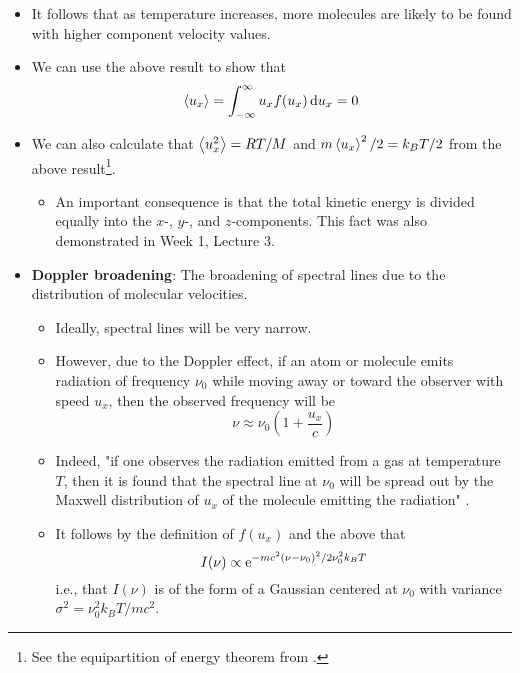 \documentclass[../notes.tex]{subfiles}
\begin{document}
\begin{itemize}
\begin{itemize}
    \end{itemize}
    \item It follows that as temperature increases, more molecules are likely to be found with higher component velocity values.
    \item We can use the above result to show that
    \begin{equation*}
        \prb{u_x} = \int_{-\infty}^\infty u_xf(u_x)\dd{u_x} = 0
    \end{equation*}
    \item We can also calculate that $\prb{u_x^2}=RT/M$ and $m\prb{u_x}^2/2=k_BT/2$ from the above result\footnote{See the equipartition of energy theorem from \textcite{bib:PHYS13300Notes}.}.
    \begin{itemize}
        \item An important consequence is that the total kinetic energy is divided equally into the $x$-, $y$-, and $z$-components. This fact was also demonstrated in Week 1, Lecture 3.
    \end{itemize}
    \item \textbf{Doppler broadening}: The broadening of spectral lines due to the distribution of molecular velocities.
    \begin{itemize}
        \item Ideally, spectral lines will be very narrow.
        \item However, due to the Doppler effect, if an atom or molecule emits radiation of frequency $\nu_0$ while moving away or toward the observer with speed $u_x$, then the observed frequency will be
        \begin{equation*}
            \nu \approx \nu_0\left( 1+\frac{u_x}{c} \right)
        \end{equation*}
        \item Indeed, "if one observes the radiation emitted from a gas at temperature $T$, then it is found that the spectral line at $\nu_0$ will be spread out by the Maxwell distribution of $u_x$ of the molecule emitting the radiation" \parencite[1021]{bib:McQuarrieSimon}.
        \item It follows by the definition of $f(u_x)$ and the above that
        \begin{equation*}
            I(\nu) \propto \e[-mc^2(\nu-\nu_0)^2/2\nu_0^2k_BT]
        \end{equation*}
        i.e., that $I(\nu)$ is of the form of a Gaussian centered at $\nu_0$ with variance $\sigma^2=\nu_0^2k_BT/mc^2$.
    \end{itemize}

\end{itemize}
\end{document}
